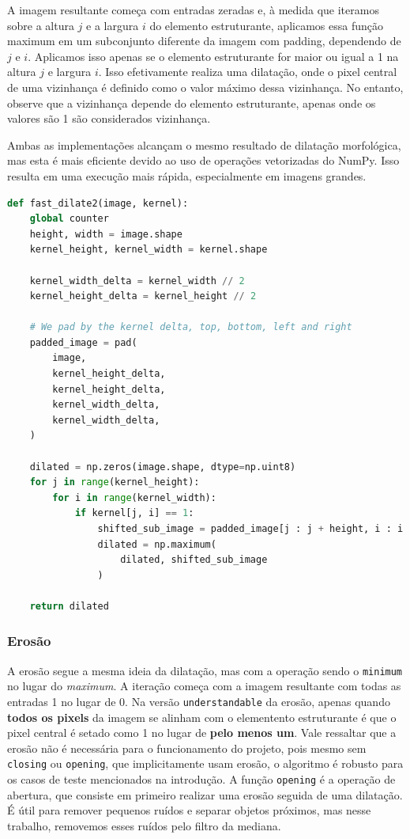 \documentclass[english, 
               brazil, 
               bsc] %
               {dcomp-abntex2}
\begin{document}
A imagem resultante começa com entradas zeradas e, à medida que iteramos sobre a altura $j$ e a largura $i$ do elemento estruturante, aplicamos essa função maximum em um subconjunto diferente da imagem com padding, dependendo de $j$ e $i$. Aplicamos isso apenas se o elemento estruturante for maior ou igual a 1 na altura $j$ e largura $i$. Isso efetivamente realiza uma dilatação, onde o pixel central de uma vizinhança é definido como o valor máximo dessa vizinhança. No entanto, observe que a vizinhança depende do elemento estruturante, apenas onde os valores são 1 são considerados vizinhança.

Ambas as implementações alcançam o mesmo resultado de dilatação morfológica, mas esta é mais eficiente devido ao uso de operações vetorizadas do NumPy. Isso resulta em uma execução mais rápida, especialmente em imagens grandes.

\begin{codigo}[h]
  \caption{\small.}
 \label{fdilate2}
\begin{lstlisting}[language=python]
def fast_dilate2(image, kernel):
    global counter 
    height, width = image.shape
    kernel_height, kernel_width = kernel.shape

    kernel_width_delta = kernel_width // 2
    kernel_height_delta = kernel_height // 2

    # We pad by the kernel delta, top, bottom, left and right
    padded_image = pad(
        image,
        kernel_height_delta,
        kernel_height_delta,
        kernel_width_delta,
        kernel_width_delta,
    )

    dilated = np.zeros(image.shape, dtype=np.uint8)
    for j in range(kernel_height):
        for i in range(kernel_width):
            if kernel[j, i] == 1:
                shifted_sub_image = padded_image[j : j + height, i : i + width]
                dilated = np.maximum(
                    dilated, shifted_sub_image
                )

    return dilated
\end{lstlisting}
\end{codigo}

\subsubsection{Erosão}

A erosão segue a mesma ideia da dilatação, mas com a operação sendo o \texttt{minimum} no lugar do \textit{maximum}. A iteração começa com a imagem resultante com todas as entradas 1 no lugar de 0. Na versão \texttt{understandable} da erosão, apenas quando \textbf{todos os pixels} da imagem se alinham com o elementento estruturante é que o pixel central é setado como 1 no lugar de \textbf{pelo menos um}. Vale ressaltar que a erosão não é necessária para o funcionamento do projeto, pois mesmo sem \texttt{closing} ou \texttt{opening}, que implicitamente usam erosão, o algoritmo é robusto para os casos de teste mencionados na introdução. A função \texttt{opening} é a operação de abertura, que consiste em primeiro realizar uma erosão seguida de uma dilatação. É útil para remover pequenos ruídos e separar objetos próximos, mas nesse trabalho, removemos esses ruídos pelo filtro da mediana.
\end{document}

